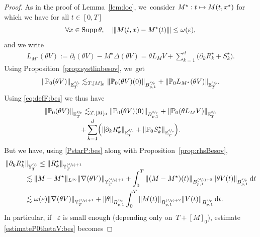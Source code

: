 \documentclass[JEP,XML,SOM,Unicode,published]{cedram}
\newcommand\mto{\mathchoice{\longmapsto}{\mapsto}{\mapsto}{\mapsto}}
\newcommand{\Psfrac}[2]{(\sfrac{#1}{#2})}
\DeclareMathOperator{\Supp}{Supp}
\theoremstyle{definition}
\newcommand\dd{\mathrm{d}}
\let\ep\varepsilon
\newcommand{\vertiii}[1]{{\vert\kern-0.08em\vert\kern-0.08em\vert #1 \vert\kern-0.08em\vert\kern-0.08em\vert}}
\begin{document}
\begin{proof}
As in the proof of Lemma~\ref{lem:loc}, we~consider $M^\star: t\mto M(t,x^\star)$ for which we have for all $t\in[0,T]$\vspace*{-3pt}
\begin{equation}\label{PstarP:bes}
\forall x \in \Supp \theta, \quad \vertiii{M(t,x)-M^\star(t)} \leq \omega(\ep),
\end{equation}
and we write\vspace*{-3pt}
\begin{align} \label{eq:defF:bes}
L_{M^\star}(\theta V):= \partial_t(\theta V)- M^\star \Delta (\theta V)= \theta L_{M}V + \sum_{k=1}^d \bigl(\partial_kR_k^\star + S^\star_k \bigr).
\end{align}
Using Proposition~\ref{prop:systlinbesov}, we~get\vspace*{-3pt}
\[
\|\mathbb{P}_0(\theta V)\|_{{\mathbb E}^{\sfrac dp}_T} \lesssim_{T,[M]_0} \|\mathbb{P}_0(\theta V)(0)\|_{B^{\sfrac dp}_{p,1}} + \|\mathbb{P}_0 L_{M^\star}(\theta V)\|_{{\mathbb E}^{\sfrac dp}_T}.
\]
Using \eqref{eq:defF:bes} we thus have\vspace*{-5pt}
\begin{multline}\label{estimateP0thetaV:bes}
\|\mathbb{P}_0(\theta V)\|_{{\mathbb E}^{\sfrac dp}_T} \lesssim_{T,[M]_0} \|\mathbb{P}_0(\theta V)(0)\|_{B^{\sfrac dp}_{p,1}} + \|\mathbb{P}_0 (\theta L_{M}V) \|_{{\mathbb E}^{\sfrac dp}_T} \\[-3pt]
+ \sum_{k=1}^d\Bigl(\|\partial_k R_k^\star\|_{{\mathbb E}^{\sfrac dp}_T} + \|\mathbb{P}_0 S_k^\star\|_{{\mathbb E}^{\sfrac dp}_T} \Bigr).
\end{multline}
But we have, using \eqref{PstarP:bes} along with Proposition~\ref{prop:rhsBesov},
\[
\begin{aligned}
\|\partial_k R_k^\star&\|_{{\mathbb Y}^{\sfrac dp}_T} \leq \| R_k^\star\|_{{\mathbb Y}^{\Psfrac dp+1}_T} \\[-5pt]
& \lesssim \|M - M^\star\|_{L^\infty } \|\nabla (\theta V)\|_{ {\mathbb Y}^{\Psfrac dp+1}_T}+
\int_0^T \| (M - M^\star)(t)\|_{B^{\Psfrac dp+2}_{p,1}} \|\theta V(t)\|_{B^{\sfrac dp}_{p,1}} \, \dd t\\
&\lesssim \omega(\ep) \| \nabla(\theta V) \|_{{\mathbb Y}^{\Psfrac dp+1}_T} + \|\theta \|_{ B^{\sfrac dp}_{p,1}} \int_0^T
\| M(t)\|_{ B^{\Psfrac dp+2}_{p,1}} \|V(t)\|_{ B^{\sfrac dp}_{p,1}}\, \dd t.
\end{aligned}
\]
In particular, if ~$\ep $ is small enough (depending only on~$T+[M]_0$), estimate \eqref{estimateP0thetaV:bes} becomes\vspace*{-3pt}

\end{proof}
\end{document}
